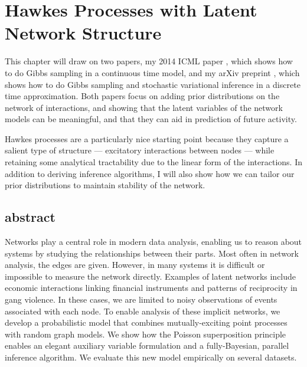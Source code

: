 
\chapter{Hawkes Processes with Latent Network Structure}

This chapter will draw on two papers, my 2014 ICML paper \cite{linderman2014discovering}, 
which shows how to do Gibbs sampling in a continuous time model,
and my arXiv preprint \cite{linderman2015scalable}, which shows 
how to do Gibbs sampling and stochastic variational inference in 
a discrete time approximation.  Both papers focus on
adding prior distributions on the network of interactions, and 
showing that the latent variables of the network models can be 
meaningful, and that they can aid in prediction of future 
activity. 

Hawkes processes are a particularly nice starting point 
because they capture a salient type of structure --- excitatory 
interactions between nodes --- while retaining some 
analytical tractability due to the linear form of the 
interactions. In addition to deriving inference algorithms, I 
will also show how we can tailor our prior distributions to 
maintain stability of the network. 

\section{abstract}
Networks play a central role in modern data analysis, enabling us to reason about systems by studying the relationships between their parts.  Most often in network analysis, the edges are given.  However, in many systems it is difficult or impossible to measure the network directly.  Examples of latent networks include economic interactions linking financial instruments and patterns of reciprocity in gang violence.  In these cases, we are limited to noisy observations of events associated with each node.  To enable analysis of these implicit networks, we develop a probabilistic model that combines mutually-exciting point processes with random graph models.  We show how the Poisson superposition principle enables an elegant auxiliary variable formulation and a fully-Bayesian, parallel inference algorithm.  We evaluate this new model empirically on several datasets.

